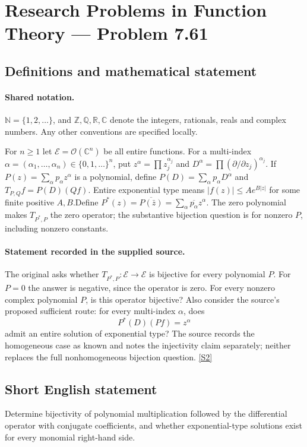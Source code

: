 \documentclass[11pt]{article}
\newcommand{\sref}[2]{\hyperlink{source:#1:#2}{[S#2]}}
\begin{document}
\section{Research Problems in Function Theory — Problem 7.61}\label{statement}

\subsection{Definitions and mathematical statement}

\paragraph{Shared notation.}$\mathbb N=\{1,2,\ldots\}$, and $\mathbb Z,\mathbb Q,\mathbb R,\mathbb C$ denote the integers, rationals, reals and complex numbers. Any other conventions are specified locally.


For $n\ge1$ let $\mathcal E=\mathcal O(\mathbb C^n)$ be all entire functions. For a multi-index $\alpha=(\alpha_1,\ldots,\alpha_n)\in\{0,1,\ldots\}^n$, put $z^\alpha=\prod z_j^{\alpha_j}$ and $D^\alpha=\prod(\partial/\partial z_j)^{\alpha_j}$. If $P(z)=\sum_\alpha p_\alpha z^\alpha$ is a polynomial, define $P(D)=\sum_\alpha p_\alpha D^\alpha$ and $T_{P,Q}f=P(D)(Qf)$. Entire exponential type means $|f(z)|\le A e^{B|z|}$ for some finite positive $A,B$.Define $P^*(z)=\overline{P(\bar z)}=\sum_\alpha\overline{p_\alpha}z^\alpha$. The zero polynomial makes $T_{P^*,P}$ the zero operator; the substantive bijection question is for nonzero $P$, including nonzero constants.
\paragraph{Statement recorded in the supplied source.}
The original asks whether $T_{P^*,P}:\mathcal E\to\mathcal E$ is bijective for every polynomial $P$. For $P=0$ the answer is negative, since the operator is zero. For every nonzero complex polynomial $P$, is this operator bijective? Also consider the source's proposed sufficient route: for every multi-index $\alpha$, does
\[P^*(D)(Pf)=z^\alpha
\]
admit an entire solution of exponential type? The source records the homogeneous case as known and notes the injectivity claim separately; neither replaces the full nonhomogeneous bijection question. \sref{statement}{2}
\subsection{Short English statement}
Determine bijectivity of polynomial multiplication followed by the differential operator with conjugate coefficients, and whether exponential-type solutions exist for every monomial right-hand side.
\end{document}

